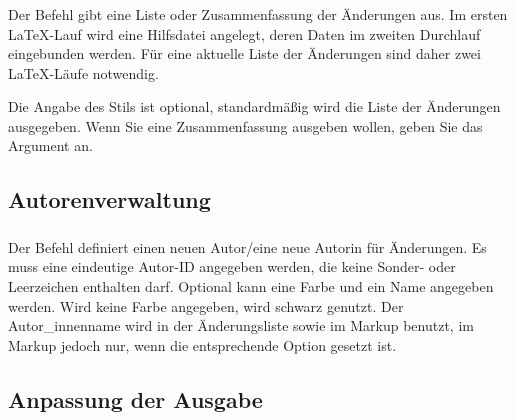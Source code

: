 \subsubsection{}
\DescribeMacro{\listofchanges}

Der Befehl  gibt eine Liste oder Zusammenfassung der Änderungen aus.
Im ersten \LaTeX-Lauf wird eine Hilfsdatei angelegt, deren Daten im zweiten Durchlauf eingebunden werden.
Für eine aktuelle Liste der Änderungen sind daher zwei \LaTeX-Läufe notwendig.

Die Angabe des Stils ist optional, standardmäßig wird die Liste der Änderungen ausgegeben.
Wenn Sie eine Zusammenfassung ausgeben wollen, geben Sie das Argument  an.





\subsection{Autorenverwaltung}
\label{sec:user:authormanagement}

\subsubsection{}

Der Befehl  definiert einen neuen Autor/eine neue Autorin für Änderungen.
Es muss eine eindeutige Autor-ID angegeben werden, die keine Sonder- oder Leerzeichen enthalten darf.
Optional kann eine Farbe und ein Name angegeben werden.
Wird keine Farbe angegeben, wird schwarz genutzt.
Der Autor\_innenname wird in der Änderungsliste sowie im Markup benutzt, im Markup jedoch nur, wenn die entsprechende Option gesetzt ist.




\subsection{Anpassung der Ausgabe}
\label{sec:user:customizingoutput}

\subsubsection{}
\DescribeMacro{\setaddedmarkup}

